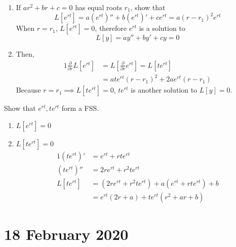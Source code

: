 \documentclass[twoside]{report}
\begin{document}
    \begin{example}
        \begin{enumerate}
            \item If $ar^{2} + br + c = 0$ has equal roots $r_{1}$, show that
            \begin{equation}
                L[e^{rt}] = a(e^{rt})'' + b(e^{rt})' + ce^{rt} = a(r - r_{1})^{2}e^{rt}
            \end{equation}
            When $r = r_{1}$, $L[e^{rt}] = 0$, therefore $e^{rt}$ is a solution to
            \begin{equation}
                L[y] = ay'' + by' + cy = 0
            \end{equation}
            \item  Then,
            \begin{alignat}{1}
                \frac{\partial}{\partial r}L[e^{rt}] &= L[\frac{\partial}{\partial r}e^{rt}]=L[te^{rt}]\\
                &= ate^{rt}(r-r_{1})^{2} + 2ae^{rt}(r-r_{1})
            \end{alignat}
            Because $r = r_{1} \implies L[te^{rt}] = 0$, $te^{rt}$ is another solution to $L[y] = 0$.
        \end{enumerate}
        Show that $e^{rt}, te^{rt}$ form a FSS.
        \begin{enumerate}[label=\alph*.]
            \item $L[e^{rt}] = 0$
            \item $L[te^{rt}] = 0$
            \begin{alignat}{1}
                (te^{rt})' &= e^{rt} + rte^{rt}\\
                (te^{rt})'' &= 2re^{rt} + r^{2}te^{rt}\\
                L[te^{rt}] &= (2re^{rt} + r^{2}te^{rt}) + a(e^{rt} + rte^{rt}) + b\\
                &= e^{rt}(2r + a) + te^{rt}(r^{2} + ar + b)
            \end{alignat}
        \end{enumerate}
    \end{example}
    \chapter{18 February 2020}
\end{document}
